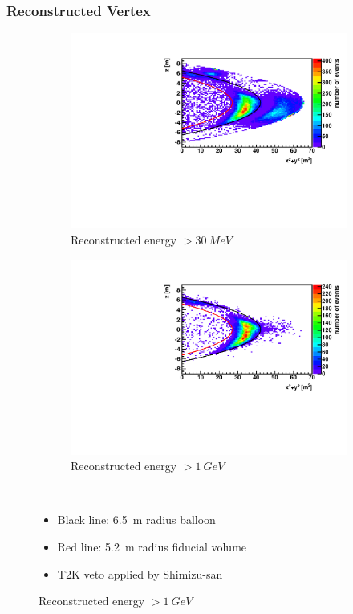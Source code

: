 \documentclass{beamer}
\begin{document}
\begin{frame}
	\frametitle{Reconstructed Vertex}
	\begin{figure}
		\centering
		\begin{subfigure}[b]{0.49\linewidth}
			\caption*{ Reconstructed energy $> \SI{30}{MeV}$ }
			\includegraphics[width=\linewidth]{kat_vertex_min30mev.pdf}
		\end{subfigure}
		\begin{subfigure}[b]{0.49\linewidth}
			\caption*{ Reconstructed energy $> \SI{1}{GeV}$ }
			\includegraphics[width=\linewidth]{kat_vertex_min1gev.pdf}
		\end{subfigure} \\
		\begin{itemize}
			\item Black line: \SI{6.5}{\meter} radius balloon
			\item Red line: \SI{5.2}{\meter} radius fiducial volume
			\item T2K veto applied by Shimizu-san
		\end{itemize}
	\end{figure}
\end{frame}
\end{document}
